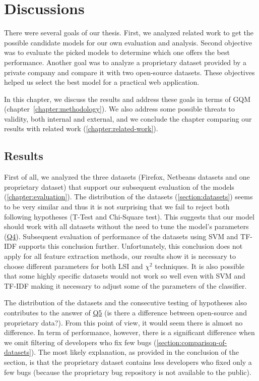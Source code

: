 \chapter{Discussions}

There were several goals of our thesis. First, we analyzed related work to get the possible candidate models for our own evaluation and analysis. Second objective was to evaluate the picked models to determine which one offers the best performance. Another goal was to analyze a proprietary dataset provided by a private company and compare it with two open-source datasets. These objectives helped us select the best model for a practical web application.

In this chapter, we discuss the results and address these goals in terms of GQM (chapter~\ref{chapter:methodology}). We also address some possible threats to validity, both internal and external, and we conclude the chapter comparing our results with related work (\autoref{chapter:related-work}).

\section{Results}

First of all, we analyzed the three datasets (Firefox, Netbeans datasets and one proprietary dataset) that support our subsequent evaluation of the models (\autoref{chapter:evaluation}). The distribution of the datasets (\autoref{section:datasets}) seems to be very similar and thus it is not surprising that we fail to reject both following hypotheses (T-Test and Chi-Square test). This suggests that our model should work with all datasets without the need to tune the model's parameters (\hyperlink{question:4}{Q4}). Subsequent evaluation of performance of the datasets using SVM and TF-IDF supports this conclusion further. Unfortunately, this conclusion does not apply for all feature extraction methods, our results show it is necessary to choose different parameters for both LSI and $\chi^2$ techniques. It is also possible that some highly specific datasets would not work so well even with SVM and TF-IDF making it necessary to adjust some of the parameters of the classifier.

The distribution of the datasets and the consecutive testing of hypotheses also contributes to the answer of \hyperlink{question:5}{Q5} (is there a difference between open-source and proprietary data?). From this point of view, it would seem there is almost no difference. In term of performance, however, there is a significant difference when we omit filtering of developers who fix few bugs (\autoref{section:comparison-of-datasets}). The most likely explanation, as provided in the conclusion of the section, is that the proprietary dataset contains less developers who fixed only a few bugs (because the proprietary bug repository is not available to the public).


